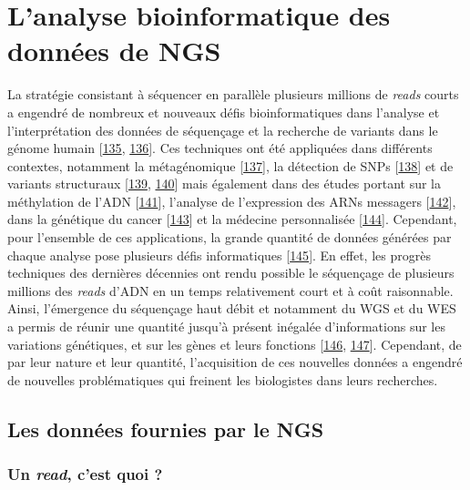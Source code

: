 \documentclass[12pt,a4paper,twoside]{ugathesis}
\theoremstyle{definition}
\theoremstyle{definition}
\theoremstyle{definition}
\theoremstyle{remark}
\begin{document}
\newpage  

\section{L'analyse bioinformatique des données de
NGS}\label{lanalyse-bioinformatique-des-donnees-de-ngs}

La stratégie consistant à séquencer en parallèle plusieurs millions de
\emph{reads} courts a engendré de nombreux et nouveaux défis
bioinformatiques dans l'analyse et l'interprétation des données de
séquençage et la recherche de variants dans le génome humain
{[}\protect\hyperlink{ref-Wold2007}{135},
\protect\hyperlink{ref-Yang2009}{136}{]}. Ces techniques ont été
appliquées dans différents contextes, notamment la métagénomique
{[}\protect\hyperlink{ref-Qin2010}{137}{]}, la détection de SNPs
{[}\protect\hyperlink{ref-VanTassell2008}{138}{]} et de variants
structuraux {[}\protect\hyperlink{ref-Alkan2010}{139},
\protect\hyperlink{ref-Medvedev2009}{140}{]} mais également dans des
études portant sur la méthylation de l'ADN
{[}\protect\hyperlink{ref-Taylor2007}{141}{]}, l'analyse de l'expression
des ARNs messagers {[}\protect\hyperlink{ref-Sultan2008}{142}{]}, dans
la génétique du cancer {[}\protect\hyperlink{ref-Guffanti2009}{143}{]}
et la médecine personnalisée
{[}\protect\hyperlink{ref-Auffray2009}{144}{]}. Cependant, pour
l'ensemble de ces applications, la grande quantité de données générées
par chaque analyse pose plusieurs défis informatiques
{[}\protect\hyperlink{ref-Horner2009}{145}{]}. En effet, les progrès
techniques des dernières décennies ont rendu possible le séquençage de
plusieurs millions des \emph{reads} d'ADN en un temps relativement court
et à coût raisonnable. Ainsi, l'émergence du séquençage haut débit et
notamment du WGS et du WES a permis de réunir une quantité jusqu'à
présent inégalée d'informations sur les variations génétiques, et sur
les gènes et leurs fonctions {[}\protect\hyperlink{ref-Mardis2008}{146},
\protect\hyperlink{ref-Bentley2006}{147}{]}. Cependant, de par leur
nature et leur quantité, l'acquisition de ces nouvelles données a
engendré de nouvelles problématiques qui freinent les biologistes dans
leurs recherches.

\subsection{Les données fournies par le
NGS}\label{les-donnees-fournies-par-le-ngs}

\subsubsection{\texorpdfstring{Un \emph{read}, c'est quoi
?}{Un read, c'est quoi ?}}\label{un-read-cest-quoi}
\end{document}
